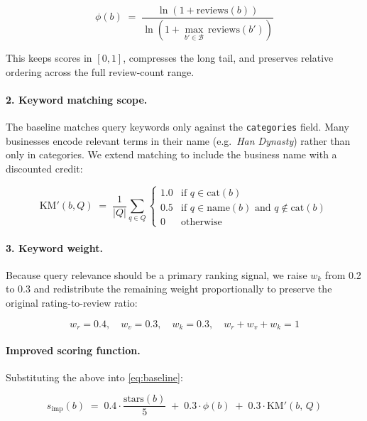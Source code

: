 \begin{equation}
  \phi(b) \;=\;
    \frac{\ln\!\left(1 + \text{reviews}(b)\right)}
         {\ln\!\left(1 + \max_{b' \in \mathcal{B}}\,\text{reviews}(b')\right)}
  \label{eq:log_norm}
\end{equation}

\noindent This keeps scores in $[0,1]$, compresses the long tail, and
preserves relative ordering across the full review-count range.

\paragraph{2. Keyword matching scope.}
The baseline matches query keywords only against the \texttt{categories}
field.  Many businesses encode relevant terms in their name (e.g.\
\textit{Han Dynasty}) rather than only in categories.  We extend
matching to include the business name with a discounted credit:

\begin{equation}
  \text{KM}'(b, Q) \;=\;
    \frac{1}{|Q|}\sum_{q \in Q}
    \begin{cases}
      1.0 & \text{if } q \in \text{cat}(b) \\
      0.5 & \text{if } q \in \text{name}(b) \text{ and } q \notin \text{cat}(b) \\
      0   & \text{otherwise}
    \end{cases}
  \label{eq:km_improved}
\end{equation}

\paragraph{3. Keyword weight.}
Because query relevance should be a primary ranking signal, we raise
$w_k$ from 0.2 to 0.3 and redistribute the remaining weight
proportionally to preserve the original rating-to-review ratio:

\begin{equation}
  w_r = 0.4,\quad w_v = 0.3,\quad w_k = 0.3,\quad w_r + w_v + w_k = 1
  \label{eq:weights}
\end{equation}

\paragraph{Improved scoring function.}
Substituting the above into \eqref{eq:baseline}:

\begin{equation}
  s_{\text{imp}}(b) \;=\;
    0.4\cdot\frac{\text{stars}(b)}{5}
    \;+\; 0.3\cdot\phi(b)
    \;+\; 0.3\cdot\text{KM}'(b,\,Q)
  \label{eq:improved}
\end{equation}


